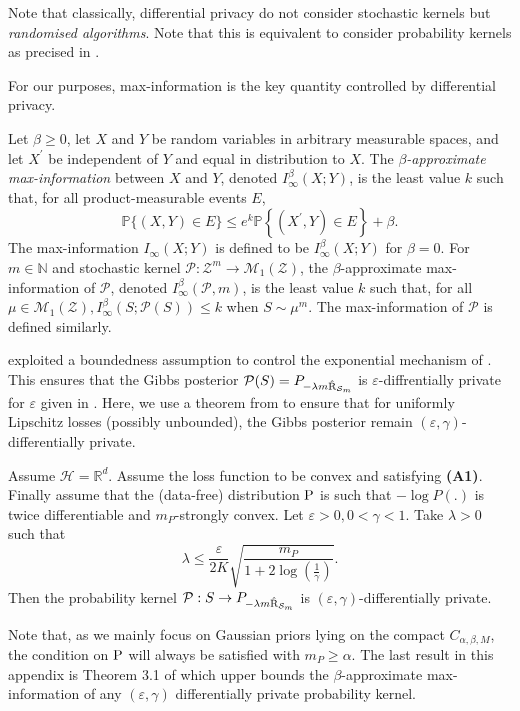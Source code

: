 \begin{noaddcontents}
\begin{remark}
Note that classically, differential privacy do not consider stochastic kernels but \emph{randomised algorithms}. Note that this is equivalent to consider probability kernels as precised in \citet[footnote 3, Appendix A]{dziugaite2018data}.
\end{remark}
For our purposes, max-information is the key quantity controlled by differential privacy.
\begin{definition}
Let $\beta \geq 0$, let $X$ and $Y$ be random variables in arbitrary measurable spaces, and let $X^{\prime}$ be independent of $Y$ and equal in distribution to $X$. The \emph{$\beta$-approximate max-information} between $X$ and $Y$, denoted $I_{\infty}^\beta(X ; Y)$, is the least value $k$ such that, for all product-measurable events $E$,
$$
\mathbb{P}\{(X, Y) \in E\} \leq e^k \mathbb{P}\left\{\left(X^{\prime}, Y\right) \in E\right\}+\beta .
$$
The max-information $I_{\infty}(X ; Y)$ is defined to be $I_{\infty}^\beta(X ; Y)$ for $\beta=0$.
For $m \in \mathbb{N}$ and stochastic kernel $\mathcal{P}: \mathcal{Z}^m \rightarrow \mathcal{M}_1(\mathcal{Z})$, the $\beta$-approximate max-information of $\mathcal{P}$, denoted $I_{\infty}^\beta(\mathcal{P}, m)$, is the least value $k$ such that, for all $\mu \in \mathcal{M}_1(\mathcal{Z}), I_{\infty}^\beta(S ; \mathcal{P}(S)) \leq k$
when $S \sim \mathcal{\mu}^m$. The max-information of $\mathcal{P}$ is defined similarly.
\end{definition}
\citet{dziugaite2018data} exploited a boundedness assumption to control the exponential mechanism of \citet{mcsherry2007mechanism}. This ensures that the Gibbs posterior $\mathcal{P}(S)= P_{-\lambda m \Riskhat_{\Sm}}$ is $\varepsilon$-diffrentially private for $\varepsilon$ given in \citet[Corollary 5.2]{dziugaite2018data}.
Here, we use a theorem from \citet{minami2016diff} to ensure that for uniformly Lipschitz losses (possibly unbounded), the Gibbs posterior remain $(\varepsilon, \gamma)$-differentially private.

\begin{proposition}
\label{prop: minami}
Assume $\mathcal{H}=\mathbb{R}^d$. Assume the loss function to be convex and satisfying \textbf{(A1)}. Finally assume that the (data-free) distribution $\P$ is such that $-\log P(.)$ is twice differentiable and $m_P$-strongly convex.
Let $\varepsilon>0, 0<\gamma<1$. Take $\lambda>0$ such that
\[ \lambda \leq \frac{\varepsilon}{2K}\sqrt{\frac{m_P}{1+ 2 \log\left( \frac{1}{\gamma}  \right)}}.  \]
Then the probability kernel $\mathcal{P} : S \rightarrow P_{-\lambda m \Riskhat_{\Sm}}$ is $(\varepsilon,\gamma)$-differentially private.
\end{proposition}
Note that, as we mainly focus on Gaussian priors lying on the compact $C_{\alpha,\beta,M}$, the condition on $\P$ will always be satisfied with $m_P\geq \alpha$. The last result in this appendix is Theorem 3.1 of \citet{rogers2016max} which upper bounds the $\beta$-approximate max-information of any $(\varepsilon,\gamma)$ differentially private probability kernel.


\end{noaddcontents}

